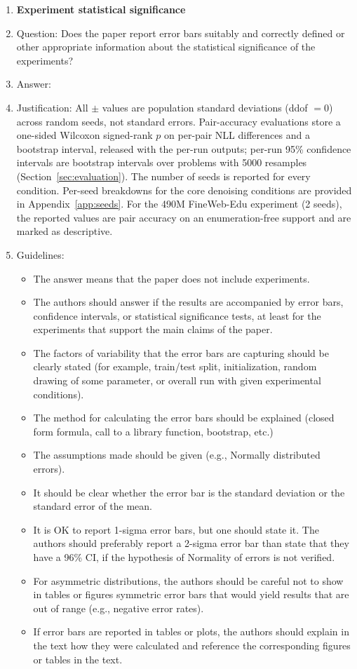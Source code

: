 \documentclass{article}
\begin{document}
\begin{enumerate}
\item {\bf Experiment statistical significance}
    \item[] Question: Does the paper report error bars suitably and correctly defined or other appropriate information about the statistical significance of the experiments?
    \item[] Answer: \answerYes{}
    \item[] Justification: All $\pm$ values are population standard deviations (ddof $=0$) across random seeds, not standard errors. Pair-accuracy evaluations store a one-sided Wilcoxon signed-rank $p$ on per-pair NLL differences and a bootstrap interval, released with the per-run outputs; per-run 95\% confidence intervals are bootstrap intervals over problems with 5000 resamples (Section~\ref{sec:evaluation}). The number of seeds is reported for every condition. Per-seed breakdowns for the core denoising conditions are provided in Appendix~\ref{app:seeds}. For the 490M FineWeb-Edu experiment (2 seeds), the reported values are pair accuracy on an enumeration-free support and are marked as descriptive.
    \item[] Guidelines:
    \begin{itemize}
        \item The answer \answerNA{} means that the paper does not include experiments.
        \item The authors should answer \answerYes{} if the results are accompanied by error bars, confidence intervals, or statistical significance tests, at least for the experiments that support the main claims of the paper.
        \item The factors of variability that the error bars are capturing should be clearly stated (for example, train/test split, initialization, random drawing of some parameter, or overall run with given experimental conditions).
        \item The method for calculating the error bars should be explained (closed form formula, call to a library function, bootstrap, etc.)
        \item The assumptions made should be given (e.g., Normally distributed errors).
        \item It should be clear whether the error bar is the standard deviation or the standard error of the mean.
        \item It is OK to report 1-sigma error bars, but one should state it. The authors should preferably report a 2-sigma error bar than state that they have a 96\% CI, if the hypothesis of Normality of errors is not verified.
        \item For asymmetric distributions, the authors should be careful not to show in tables or figures symmetric error bars that would yield results that are out of range (e.g., negative error rates).
        \item If error bars are reported in tables or plots, the authors should explain in the text how they were calculated and reference the corresponding figures or tables in the text.
    \end{itemize}


\end{enumerate}
\end{document}
